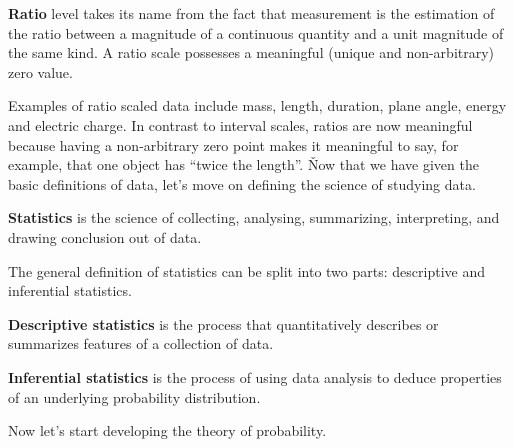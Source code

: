 \bd[Ratio]
\textbf{Ratio} level takes its name from the fact that measurement is the estimation of the ratio between a magnitude
of a continuous quantity and a unit magnitude of the same kind. A ratio scale possesses a meaningful (unique and
non-arbitrary) zero value.
\ed

Examples of ratio scaled data include mass, length, duration, plane angle, energy and electric charge. In contrast to
interval scales, ratios are now meaningful because having a non-arbitrary zero point makes it meaningful to say, for
example, that one object has ``twice the length''. \v

Now that we have given the basic definitions of data, let's move on defining the science of studying data.

\bd[Statistics]
\textbf{Statistics} is the science of collecting, analysing, summarizing, interpreting, and drawing conclusion out of
data.
\ed

The general definition of statistics can be split into two parts: descriptive and inferential statistics.

\textbf{Descriptive statistics} is the process that quantitatively describes or summarizes features of a collection of
data.
\ed

\textbf{Inferential statistics} is the process of using data analysis to deduce properties of an underlying
probability distribution.
\ed

Now let's start developing the theory of probability.